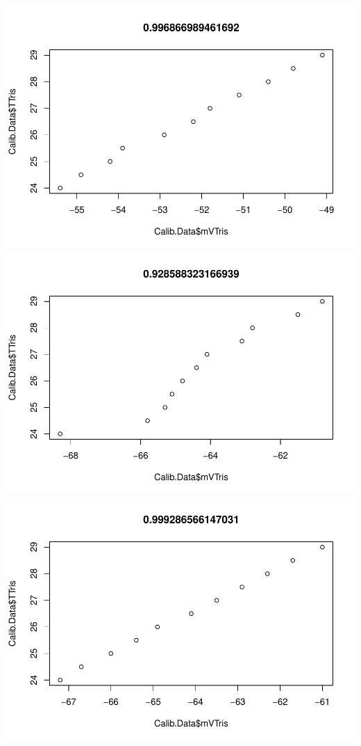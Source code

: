 \documentclass[
]{article}
\begin{document}
\includegraphics{daily-measurements_files/figure-latex/unnamed-chunk-5-1.pdf}
\includegraphics{daily-measurements_files/figure-latex/unnamed-chunk-5-2.pdf}
\includegraphics{daily-measurements_files/figure-latex/unnamed-chunk-5-3.pdf}
\end{document}
